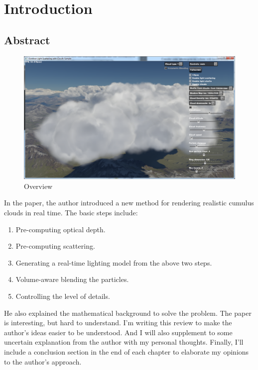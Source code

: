 \chapter{Introduction}

\section{Abstract}
\begin{figure}[htp]
\begin{center}
\includegraphics[scale=0.4]{images/overview.png}
\caption{Overview}
\label{f0}
\end{center}
\end{figure}

In the paper, the author introduced a new method for rendering realistic cumulus clouds in real time. The basic steps include:
\begin{enumerate}
\item Pre-computing optical depth.
\item Pre-computing scattering.
\item Generating a real-time lighting model from the above two steps.
\item Volume-aware blending the particles.
\item Controlling the level of details.
\end{enumerate}
He also explained the mathematical background to solve the problem. The paper is interesting, but hard to understand. I'm writing this review to make the author's ideas easier to be understood. And I will also supplement to some uncertain explanation from the author with my personal thoughts. Finally, I'll include a conclusion section in the end of each chapter to elaborate my opinions to the author's approach.